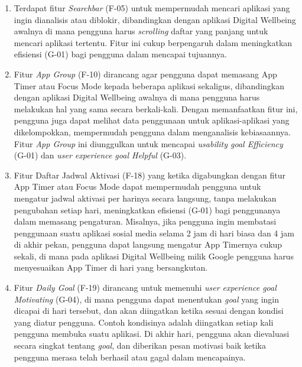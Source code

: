 \begin{enumerate}
  \item Terdapat fitur \textit{Searchbar} (F-05) untuk mempermudah mencari aplikasi yang ingin dianalisis atau diblokir, dibandingkan dengan aplikasi Digital Wellbeing awalnya di mana pengguna harus \textit{scrolling} daftar yang panjang untuk mencari aplikasi tertentu. Fitur ini cukup berpengaruh dalam meningkatkan efisiensi (G-01) bagi pengguna dalam mencapai tujuannya.
  
  \item Fitur \textit{App Group} (F-10) dirancang agar pengguna dapat memasang App Timer atau Focus Mode kepada beberapa aplikasi sekaligus, dibandingkan dengan aplikasi Digital Wellbeing awalnya di mana pengguna harus melakukan hal yang sama secara berkali-kali. Dengan memanfaatkan fitur ini, pengguna juga dapat melihat data penggunaan untuk aplikasi-aplikasi yang dikelompokkan, mempermudah pengguna dalam menganalisis kebiasaannya. Fitur \textit{App Group} ini diunggulkan untuk mencapai \textit{usability goal Efficiency} (G-01) dan \textit{user experience goal Helpful} (G-03). 
  
  \item Fitur Daftar Jadwal Aktivasi (F-18) yang ketika digabungkan dengan fitur App Timer atau Focus Mode dapat mempermudah pengguna untuk mengatur jadwal aktivasi per harinya secara langsung, tanpa melakukan pengubahan setiap hari, meningkatkan efisiensi (G-01) bagi penggunanya dalam memasang pengaturan.  Misalnya, jika pengguna ingin membatasi penggunaan suatu aplikasi sosial media selama 2 jam di hari biasa dan 4 jam di akhir pekan, pengguna dapat langsung mengatur App Timernya cukup sekali, di mana pada aplikasi Digital Wellbeing milik Google pengguna harus menyesuaikan App Timer di hari yang bersangkutan.
  
  \item Fitur \textit{Daily Goal} (F-19) dirancang untuk memenuhi \textit{user experience goal Motivating} (G-04), di mana pengguna dapat menentukan \textit{goal} yang ingin dicapai di hari tersebut, dan akan diingatkan ketika sesuai dengan kondisi yang diatur pengguna. Contoh kondisinya adalah diingatkan setiap kali pengguna membuka suatu aplikasi. Di akhir hari, pengguna akan dievaluasi secara singkat tentang \textit{goal}, dan diberikan pesan motivasi baik ketika pengguna merasa telah berhasil atau gagal dalam mencapainya.
\end{enumerate}



